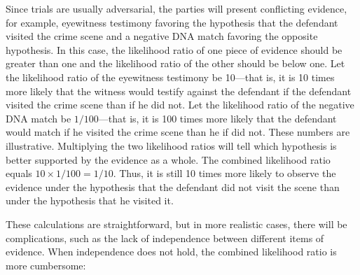 \documentclass{article}
\begin{document}
Since trials are usually adversarial, the parties will present conflicting evidence, for example, eyewitness testimony favoring the hypothesis that the defendant visited the crime scene and a negative DNA match favoring the opposite hypothesis. In this case, the likelihood ratio of one piece of evidence should be greater than one and the likelihood ratio of the other should be below one. Let the likelihood ratio of the eyewitness testimony be 10---that is, it is 10 times more likely that the witness would testify against the defendant if the defendant visited the crime scene than if he did not. Let the likelihood ratio of the negative DNA match be $1/100$---that is, it is 100 times more likely that the defendant would match if he visited the crime scene than he if did not. These numbers are illustrative. Multiplying the two likelihood ratios will tell which  hypothesis is better supported by the evidence as a whole. The combined likelihood ratio equals $10\times 1/100=1/10$. Thus, it is still 10 times more likely to observe the evidence under the hypothesis that the defendant did not visit the scene than under the hypothesis that he visited it. %


These calculations are straightforward, but 
in more realistic cases, there will be complications, such as the lack of independence between   
different items of evidence.
When independence does not hold, the combined likelihood ratio is more cumbersome:
\end{document}
